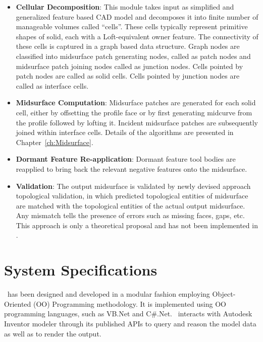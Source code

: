 \begin{itemize}[noitemsep,topsep=2pt,parsep=2pt,partopsep=2pt]
\item \textbf{Cellular Decomposition}: This module takes input as simplified and generalized feature based CAD model and decomposes it into finite number of manageable volumes called ``cells''. These cells typically represent primitive shapes of solid, each with a Loft-equivalent owner feature. The connectivity of these cells is captured in a graph based data structure.  Graph nodes are classified into midsurface patch generating nodes, called as patch nodes and midsurface patch joining nodes called as junction nodes. Cells pointed by patch nodes are called as solid cells. Cells pointed by junction nodes are called as interface cells.

\item \textbf{Midsurface Computation}: Midsurface patches are generated for each solid cell, either by offsetting the profile face or by first generating midcurve from the profile followed by lofting it. Incident midsurface patches are subsequently joined within interface cells. Details of the algorithms are presented in Chapter~\ref{ch:Midsurface}.


\item \textbf{Dormant Feature Re-application}: Dormant feature tool bodies are reapplied to bring back the relevant negative features onto the midsurface. 

\item \textbf{Validation}: The output midsurface is validated by newly devised approach topological validation, in which predicted topological entities of midsurface are matched with the topological entities of the actual output midsurface. Any mismatch tells the presence of errors such as missing faces, gaps, etc. This approach is only a theoretical proposal and has not been  implemented in \mysystemname.
\end{itemize}

\section{System Specifications} \label{sec:proposal:sysspecs}

\mysystemname~has been designed and developed in a modular fashion employing Object-Oriented (OO) Programming  methodology. It is implemented using OO programming languages, such as VB.Net and C\#.Net. \mysystemname~interacts with Autodesk Inventor modeler through its published APIs to query and reason the model data as well as to render the output. 

